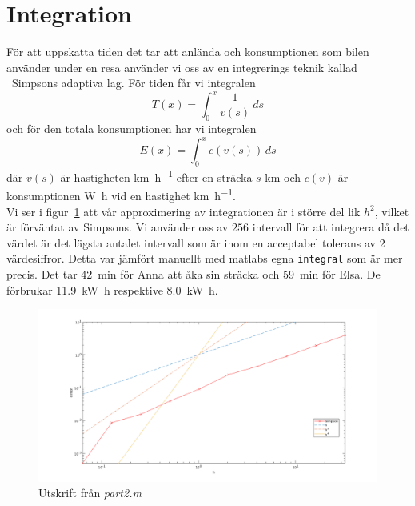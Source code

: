 \documentclass[]{scrreprt}
\begin{document}
\section{Integration}
För att uppskatta tiden det tar att anlända och konsumptionen som bilen använder under en resa använder vi oss av en integrerings teknik kallad ~Simpsons adaptiva lag.\cite[]{asimpson}
För tiden får vi integralen
\[ T(x) = \int_0^x \dfrac{1}{v(s)} \, ds \]
och för den totala konsumptionen har vi integralen
\[ E(x) = \int_0^x c(v(s)) \, ds \]
där \(v(s)\) är hastigheten \si{\kilo\meter\per\hour} efter en sträcka \(s\) \si{\kilo\meter} och \(c(v)\) är konsumptionen \si{\watt\hour} vid en hastighet \si{\kilo\meter\per\hour}.\\
Vi ser i figur~\ref{fig:conv} att vår approximering av integrationen är i större del lik \(h^2\), vilket är förväntat av Simpsons. Vi använder oss av $256$ intervall för att integrera då det värdet är det lägsta antalet intervall som är inom en acceptabel tolerans av 2 värdesiffror. Detta var jämfört manuellt med matlabs egna \texttt{integral} som är mer precis. Det tar \SI{42}{\minute} för Anna att åka sin sträcka och \SI{59}{\minute} för Elsa. De förbrukar \SI{11.9}{\kilo\watt\hour} respektive \SI{8.0}{\kilo\watt\hour}.
\begin{figure}
	\caption{Utskrift  från \textit{part2.m}}
	\label{fig:conv}
	\includegraphics[width=1.2\textwidth]{roadster/conv.png}
\end{figure}
\end{document}
